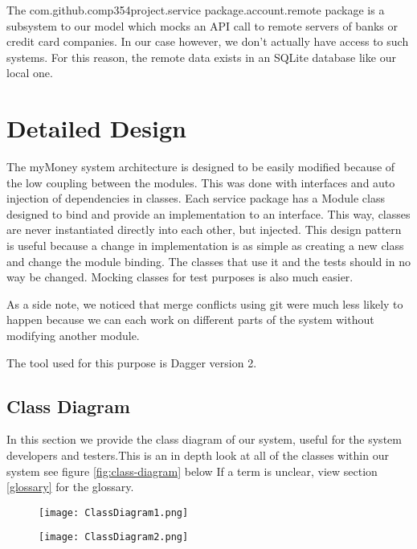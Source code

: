 \documentclass[12pt]{article}
\begin{document}
The com.github.comp354project.service package.account.remote package is a subsystem to our model which mocks an API call to remote servers of banks or credit card companies. In our case however, we don't actually have access to such systems. For this reason, the remote data exists in an SQLite database like our local one.

\clearpage

\section{Detailed Design} \label{sec:detail}

The myMoney system architecture is designed to be easily modified because of the low coupling between the modules. This was done with interfaces and auto injection of dependencies in classes. Each service package has a Module class designed to bind and provide an implementation to an interface. This way, classes are never instantiated directly into each other, but injected. This design pattern is useful because a change in implementation is as simple as creating a new class and change the module binding. The classes that use it and the tests should in no way be changed. Mocking classes for test purposes is also much easier.

As a side note, we noticed that merge conflicts using git were much less likely to happen because we can each work on different parts of the system without modifying another module.

The tool used for this purpose is Dagger version 2.

\subsection{Class Diagram}

In this section we provide the class diagram of our system, useful for the system developers and testers.This is an in depth look at all of the classes within our system see figure \ref{fig:class-diagram} below If a term is unclear, view section \ref{glossary} for the glossary.

\begin{figure}[H]
\texttt{[image: ClassDiagram1.png]}
\end{figure}

\begin{figure}[H]
\texttt{[image: ClassDiagram2.png]}
\end{figure}
\end{document}

